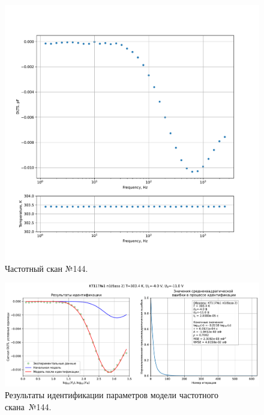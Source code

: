 \begin{figure}[!ht]
    \centering
    \includegraphics[width=1\textwidth]{../plots/КТ117№1_п1(база 2)_2500Гц-1Гц_1пФ_+30С_-4В-11В_200мВ_20мкс_шаг_0,1.pdf}
    \caption{Частотный скан №144.}
    \label{pic:frequency_scan_144}
\end{figure}

\begin{figure}[!ht]
    \centering
    \includegraphics[width=1\textwidth]{../plots/КТ117№1_п1(база 2)_2500Гц-1Гц_1пФ_+30С_-4В-11В_200мВ_20мкс_шаг_0,1_model.pdf}
    \caption{Результаты идентификации параметров модели частотного скана~№144.}
    \label{pic:frequency_scan_model144}
\end{figure}

\pagebreak


